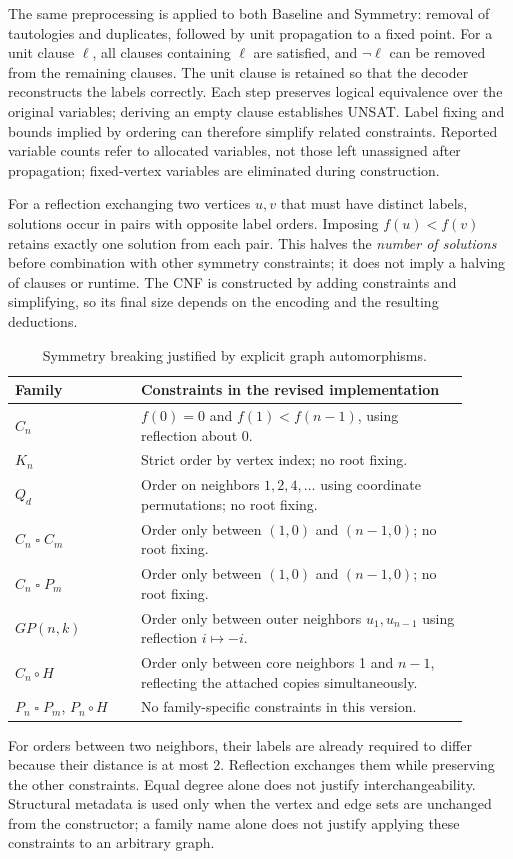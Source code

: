 The same preprocessing is applied to both Baseline and Symmetry: removal
of tautologies and duplicates, followed by unit propagation to a fixed point.
For a unit clause $\ell$, all clauses containing $\ell$ are satisfied, and
$\neg\ell$ can be removed from the remaining clauses. The unit clause is
retained so that the decoder reconstructs the labels correctly. Each step
preserves logical equivalence over the original variables; deriving an empty
clause establishes UNSAT. Label fixing and bounds implied by ordering can
therefore simplify related constraints. Reported variable counts refer to
allocated variables, not those left unassigned after propagation; fixed-vertex
variables are eliminated during construction.

For a reflection exchanging two vertices $u,v$ that must have distinct labels,
solutions occur in pairs with opposite label orders. Imposing $f(u)<f(v)$
retains exactly one solution from each pair. This halves the \emph{number
of solutions} before combination with other symmetry constraints; it does
not imply a halving of clauses or runtime. The CNF is constructed by adding
constraints and simplifying, so its final size depends on the encoding
and the resulting deductions.

\begin{table}[H]
\centering\small
\begin{tabular}{p{0.25\linewidth}p{0.65\linewidth}}
\toprule
Family & Constraints in the revised implementation\\
\midrule
$C_n$ & $f(0)=0$ and $f(1)<f(n-1)$, using reflection about 0.\\
$K_n$ & Strict order by vertex index; no root fixing.\\
$Q_d$ & Order on neighbors $1,2,4,\ldots$ using coordinate permutations; no root fixing.\\
$C_n\mathbin{\square} C_m$ & Order only between $(1,0)$ and $(n-1,0)$; no root fixing.\\
$C_n\mathbin{\square} P_m$ & Order only between $(1,0)$ and $(n-1,0)$; no root fixing.\\
$GP(n,k)$ & Order only between outer neighbors $u_1,u_{n-1}$ using reflection $i\mapsto-i$.\\
$C_n\circ H$ & Order only between core neighbors 1 and $n-1$, reflecting the attached copies simultaneously.\\
$P_n\mathbin{\square} P_m$, $P_n\circ H$ & No family-specific constraints in this version.\\
\bottomrule
\end{tabular}
\caption{Symmetry breaking justified by explicit graph automorphisms.}
\end{table}
For orders between two neighbors, their labels are already required to differ
because their distance is at most 2. Reflection exchanges them while preserving
the other constraints. Equal degree alone does not justify interchangeability.
Structural metadata is used only when the vertex and edge sets are unchanged
from the constructor; a family name alone does not justify applying these
constraints to an arbitrary graph.

